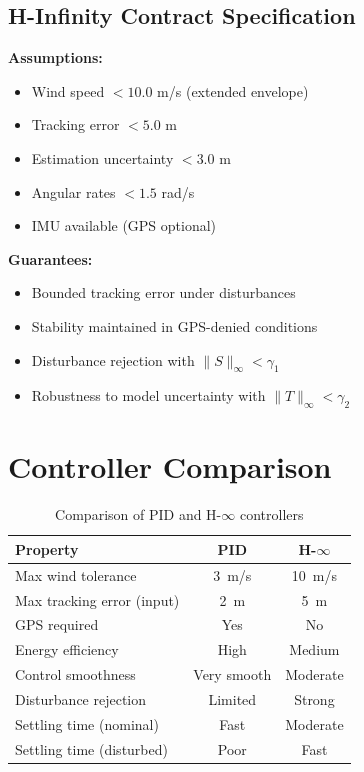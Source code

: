 \subsection{H-Infinity Contract Specification}

\begin{contractbox}
\textbf{Assumptions:}
\begin{itemize}
    \item Wind speed $< 10.0$ m/s (extended envelope)
    \item Tracking error $< 5.0$ m
    \item Estimation uncertainty $< 3.0$ m
    \item Angular rates $< 1.5$ rad/s
    \item IMU available (GPS optional)
\end{itemize}

\textbf{Guarantees:}
\begin{itemize}
    \item Bounded tracking error under disturbances
    \item Stability maintained in GPS-denied conditions
    \item Disturbance rejection with $\|S\|_\infty < \gamma_1$
    \item Robustness to model uncertainty with $\|T\|_\infty < \gamma_2$
\end{itemize}
\end{contractbox}

\section{Controller Comparison}

\begin{table}[htbp]
    \centering
    \caption{Comparison of PID and H-$\infty$ controllers}
    \label{tab:controller_comparison}
    \begin{tabular}{@{}lcc@{}}
        \toprule
        \textbf{Property} & \textbf{PID} & \textbf{H-$\infty$} \\
        \midrule
        Max wind tolerance & \SI{3}{m/s} & \SI{10}{m/s} \\
        Max tracking error (input) & \SI{2}{m} & \SI{5}{m} \\
        GPS required & Yes & No \\
        Energy efficiency & High & Medium \\
        Control smoothness & Very smooth & Moderate \\
        Disturbance rejection & Limited & Strong \\
        Settling time (nominal) & Fast & Moderate \\
        Settling time (disturbed) & Poor & Fast \\
        \bottomrule
    \end{tabular}
\end{table}

